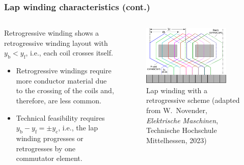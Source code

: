 \begin{frame}
	\frametitle{Lap winding characteristics (cont.)}
    \begin{columns}
		\begin{column}{0.42\textwidth}
			\begin{varblock}{Retrogressive winding}
				 shows a retrogressive winding layout with $y_\mathrm{b} < y_\mathrm{f}$, i.e., each coil crosses itself.
			\end{varblock}
			\begin{itemize}
				\item<2-> Retrogressive windings require more conductor material due to the crossing of the coils and, therefore, are less common.
				\item<3-> Technical feasibility requires $y_\mathrm{b} - y_\mathrm{f} = \pm y_\mathrm{c}$, i.e., the lap winding progresses or retrogresses by one commutator element.
			\end{itemize}
		\end{column}
        \hfill
		\begin{column}{0.55\textwidth}
			\begin{figure}
				\centering
				\includegraphics[width=0.85\textwidth]{fig/lec03/Lap_winding_distances_retrogressive.pdf}
				\caption{Lap winding with a retrogressive scheme (adapted from W.~Novender, \textit{Elektrische Maschinen}, Technische Hochschule Mittelhessen, 2023)}
				\label{fig:Lap_winding_distances_retrogressive}
			\end{figure}
		\end{column}
		\end{columns}
\end{frame}


